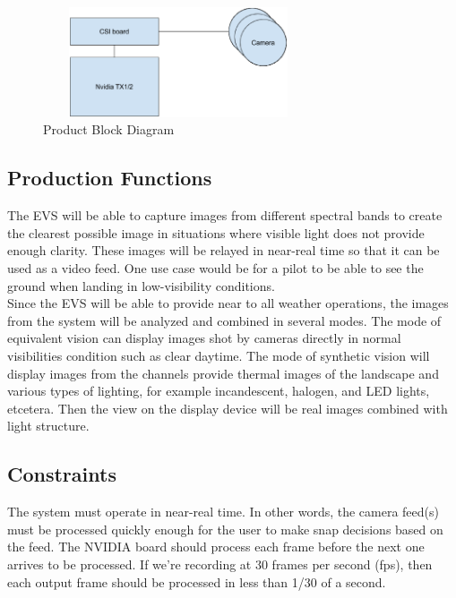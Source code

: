\documentclass[letterpaper,10pt,serif,draftclsnofoot,onecolumn,compsoc,titlepage]{IEEEtran}
\begin{document}
\begin{figure}[H]
	\centering
	\label{fig:CopyOnWriteBefore}
	\includegraphics[width=8cm,height=3.25cm]{images/block_diagram.eps}
	\caption{Product Block Diagram \label{overflow}}
\end{figure}

\subsection{Production Functions}

The EVS will be able to capture images from different spectral bands to create the 
clearest possible image in situations where visible light does not provide enough 
clarity. These images will be relayed in near-real time so that it can be used as a 
video feed. One use case would be for a pilot to be able to see the ground when landing 
in low-visibility conditions.\\

Since the EVS will be able to provide near to all weather operations, the images from 
the system will be analyzed and combined in several modes. The mode of equivalent 
vision can display images shot by cameras directly in normal visibilities condition 
such as clear daytime. The mode of synthetic vision will display images from the 
channels provide thermal images of the landscape and various types of lighting, for 
example incandescent, halogen, and LED lights, etcetera. Then the view on the display 
device will be real images combined with light structure.\\

\subsection{Constraints}

The system must operate in near-real time. In other words, the camera feed(s) must be 
processed quickly enough for the user to make snap decisions based on the feed. The 
NVIDIA board should process each frame before the next one arrives to be processed. 
If we’re recording at 30 frames per second (fps), then each output frame should be 
processed in less than 1/30 of a second.\\
\end{document}
